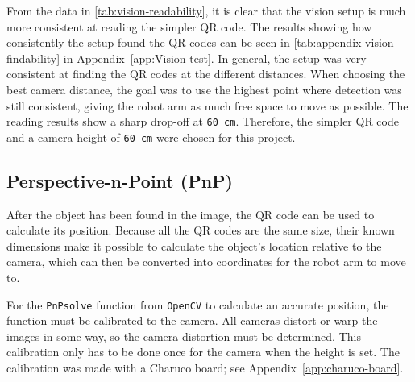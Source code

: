 From the data in \cref{tab:vision-readability}, it is clear that the vision setup is much more consistent at reading the simpler QR code. The results showing how consistently the setup found the QR codes can be seen in \cref{tab:appendix-vision-findability} in Appendix~\ref{app:Vision-test}. In general, the setup was very consistent at finding the QR codes at the different distances. When choosing the best camera distance, the goal was to use the highest point where detection was still consistent, giving the robot arm as much free space to move as possible. The reading results show a sharp drop-off at \texttt{60 cm}. Therefore, the simpler QR code and a camera height of \texttt{60 cm} were chosen for this project.



\subsection{Perspective-n-Point (PnP)}
After the object has been found in the image, the QR code can be used to calculate its position. Because all the QR codes are the same size, their known dimensions make it possible to calculate the object's location relative to the camera, which can then be converted into coordinates for the robot arm to move to.

For the \texttt{PnPsolve} function from \texttt{OpenCV} to calculate an accurate position, the function must be calibrated to the camera. All cameras distort or warp the images in some way, so the camera distortion must be determined. This calibration only has to be done once for the camera when the height is set. 
The calibration was made with a Charuco board; see Appendix~\ref{app:charuco-board}.



